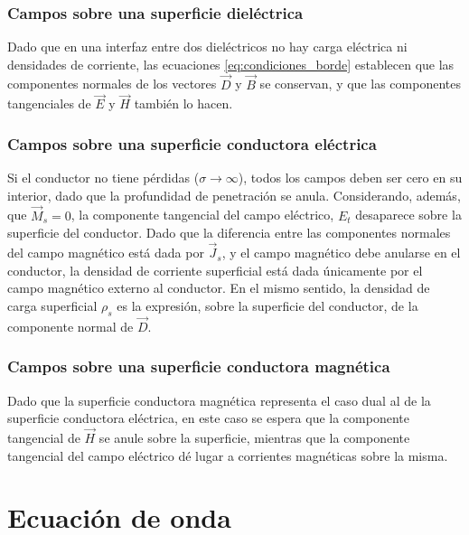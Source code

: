 \subsubsection{Campos sobre una superficie dieléctrica}
Dado que en una interfaz entre dos dieléctricos no hay carga eléctrica ni densidades de corriente, las ecuaciones \ref{eq:condiciones_borde} establecen que las componentes normales de los vectores $\vec{D}$ y $\vec{B}$ se conservan, y que las componentes tangenciales de $\vec{E}$ y $\vec{H}$ también lo hacen.

\subsubsection{Campos sobre una superficie conductora eléctrica}
Si el conductor no tiene pérdidas ($\sigma \rightarrow \infty$), todos los campos deben ser cero en su interior, dado que la profundidad de penetración se anula. Considerando, además, que $\vec{M}_s = 0$, la componente tangencial del campo eléctrico, $E_t$ desaparece sobre la superficie del conductor. Dado que la diferencia entre las componentes normales del campo magnético está dada por $\vec{J}_s$, y el campo magnético debe anularse en el conductor, la densidad de corriente superficial está dada únicamente por el campo magnético externo al conductor. En el mismo sentido, la densidad de carga superficial $\rho_s$ es la expresión, sobre la superficie del conductor, de la componente normal de $\vec{D}$.


\subsubsection{Campos sobre una superficie conductora magnética}
Dado que la superficie conductora magnética representa el caso dual al de la superficie conductora eléctrica, en este caso se espera que la componente tangencial de $\vec{H}$ se anule sobre la superficie, mientras que la componente tangencial del campo eléctrico dé lugar a corrientes magnéticas sobre la misma.


\section{Ecuación de onda}
\label{subsec_eq_de_onda}

